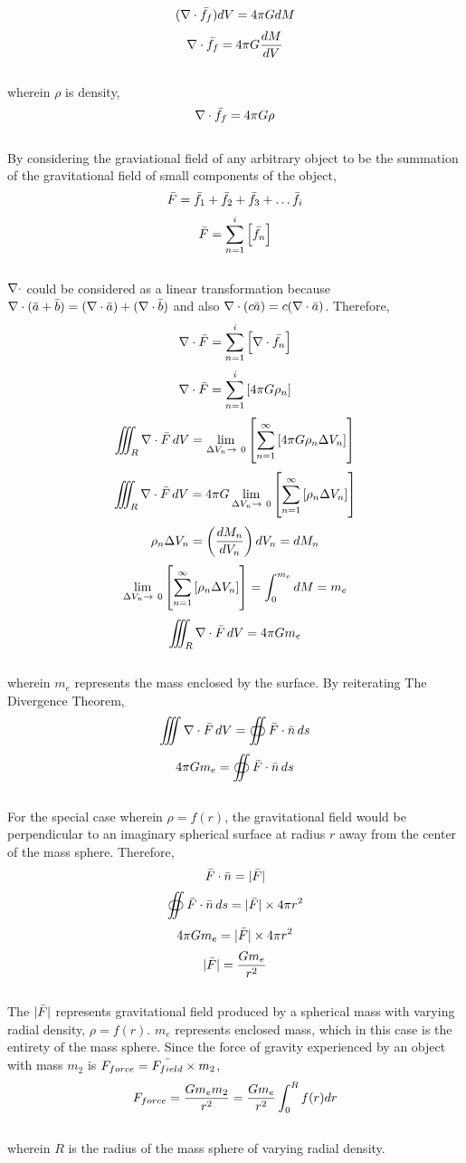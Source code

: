 \documentclass[class=report, 12pt, crop=false]{standalone}
\begin{document}
\begin{center}
$$(\nabla \cdot \bar{f_f})dV =  4 \pi G dM$$
$$\nabla \cdot \bar{f_f}=  4 \pi G \frac{dM}{dV}$$
\\wherein $\rho$ is density,
$$\nabla \cdot \bar{f_f}=  4 \pi G \rho$$
\\By considering the graviational field of any arbitrary object to be the summation of the gravitational field of small components of the object,
$$\bar{F} = \bar{f_1} + \bar{f_2} + \bar{f_3} + \dots  \bar{f_i}$$
$$\bar{F} = \sum_{n = 1}^{i} \left[\bar{f_n} \right]$$
\\$\nabla \cdot$ could be considered as a linear transformation because $\nabla \cdot (\bar{a} + \bar{b}) = (\nabla \cdot \bar{a}) + (\nabla \cdot \bar{b})$ and also $\nabla \cdot (c\bar{a}) =c  (\nabla \cdot \bar{a})$. Therefore,
$$\nabla \cdot \bar{F} = \sum_{n = 1}^{i} \left[\nabla \cdot \bar{f_n} \right]$$
$$\nabla \cdot \bar{F} = \sum_{n = 1}^{i} \left[4\pi G \rho_n \right]$$
$$\iiint_R \n \d \b{F} \,dV =\lim_{{\Delta V_n}\to\ 0}\l[ \sum_{n = 1}^{\infty} \l[4\pi G \rho_n\Delta V_n \r]\r]$$
$$\iiint_R \nabla \cdot \bar{F} \,dV =4\pi G\lim_{{\Delta V_n}\to\ 0}\left[ \sum_{n = 1}^{\infty} \left[ \rho_n\Delta V_n \right]\right]$$
$$\rho_n \Delta V_n =\left(\frac{dM_n}{dV_n}\right)dV_n = dM_n$$
$$\lim_{{\Delta V_n}\to\ 0}\left[ \sum_{n = 1}^{\infty} \left[ \rho_n\Delta V_n \right]\right] = \int_{0}^{m_{e}} dM = m_{e}$$
$$\iiint_R \nabla \cdot \bar{F} \,dV =4\pi Gm_e$$
\\wherein $m_e$ represents the mass enclosed by the surface. By reiterating The Divergence Theorem,
$$\displaystyle{\iiint \nabla\cdot\bar{F} \,dV =  \oiint {\bar{F} \cdot\bar{n}}\,ds }$$
$$4\pi Gm_e = \oiint {\bar{F} \cdot\bar{n} \, ds }$$
\\For the special case wherein $\rho = f(r)$, the gravitational field would be perpendicular to an imaginary spherical surface at radius $r$ away from the center of the mass sphere. Therefore,
$$\bar{F} \cdot \bar{n} = |\bar{F}|$$
$$\oiint {\bar{F} \cdot\bar{n}}\,ds = |\bar{F}| \times 4 \pi r^2$$
$$4 \pi G m_e = |\bar{F}| \times 4 \pi r^2$$
$$ |\bar{F}| = \frac{G m_e}{r^2} $$
\\The $|\bar{F}|$ represents gravitational field produced by a spherical mass with varying radial density, $\rho = f(r)$. $m_e$ represents enclosed mass, which in this case is the entirety of the mass sphere. Since the force of gravity experienced by an object with mass $m_2$ is $F_{force} = \bar{F_{field}} \times m_2$,
$$F_{force} = \frac{Gm_em_2}{r^2} = \frac{Gm_e}{r^2}\int_{0}^{R} f(r) dr$$
\\wherein $R$ is the radius of the mass sphere of varying radial density.
\end{center}
\end{document}
